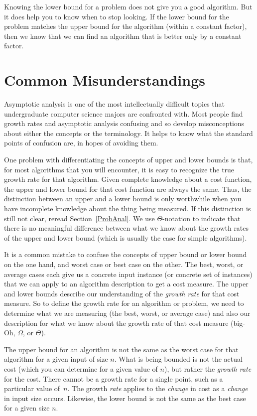 Knowing the lower bound for a problem does not give you a good
algorithm.
But it does help you to know when to stop looking.
If the lower bound for the problem matches the upper bound for the
algorithm (within a constant factor), then we know that we can find an
algorithm that is better only by a constant factor.

\section{Common Misunderstandings}

Asymptotic analysis is one of the most intellectually difficult topics
that undergraduate computer science majors are confronted with.
Most people find growth rates and asymptotic analysis
confusing and so develop misconceptions about either the concepts or
the terminology.
It helps to know what the standard points of confusion are, in hopes
of avoiding them.

One problem with differentiating the concepts of upper and lower
bounds is that, for most algorithms that you will encounter, it is
easy to recognize the true growth rate for that algorithm.
Given complete knowledge about a cost function, the upper and lower
bound for that cost function are always the same.
Thus, the distinction between an upper and a lower bound is only
worthwhile when you have incomplete knowledge about the thing being
measured.
If this distinction is still not clear, reread Section~\ref{ProbAnal}.
We use \(\Theta\)-notation to indicate that there is no meaningful
difference between what we know about the growth rates of the upper
and lower bound (which is usually the case for simple algorithms).

It is a common mistake to confuse the concepts of upper bound or lower
bound on the one hand, and worst case or best case on the other.
The best, worst, or average cases each give us a concrete input
instance (or concrete set of instances)
that we can apply to an algorithm description to get a cost measure.
The upper and lower bounds describe our understanding of the
\emph{growth rate} for that cost measure.
So to define the growth rate for an algorithm or problem, we need to
determine what we are measuring (the best, worst, or average case) and
also our description for what we know about the growth rate of that
cost measure (big-Oh, \(\Omega\), or \(\Theta\)).

The upper bound for an algorithm is not the same as the worst case for 
that algorithm for a given input of size \(n\).
What is being bounded is not the actual cost (which you can
determine for a given value of \(n\)), but rather the 
\emph{growth rate} for the cost.
There cannot be a growth rate for a single point, such as a particular 
value of~\(n\).
The growth \emph{rate} applies to the \emph{change} in cost as a
\emph{change} in input size occurs.
Likewise, the lower bound is not the same as the best case for a given 
size \(n\).

